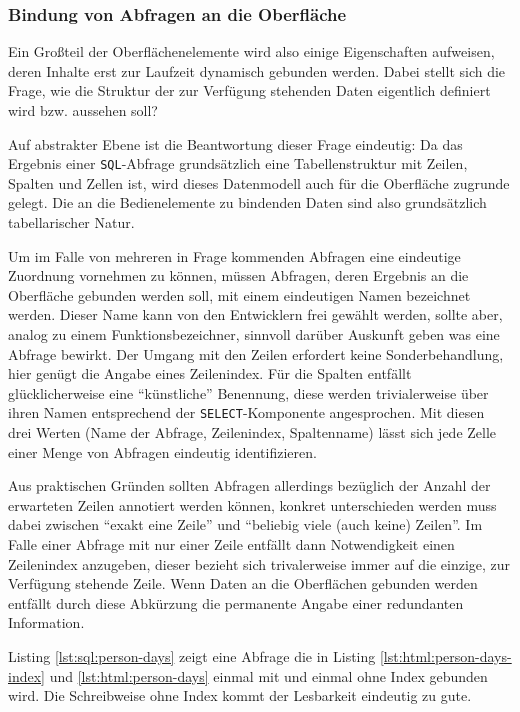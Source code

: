 \subsubsection{Bindung von Abfragen an die Oberfläche}
\label{sec:design-ui-bind-output}

Ein Großteil der Oberflächenelemente wird also einige Eigenschaften aufweisen, deren Inhalte erst zur Laufzeit dynamisch gebunden werden. Dabei stellt sich die Frage, wie die Struktur der zur Verfügung stehenden Daten eigentlich definiert wird bzw. aussehen soll?

Auf abstrakter Ebene ist die Beantwortung dieser Frage eindeutig: Da das Ergebnis einer \texttt{SQL}-Abfrage grundsätzlich eine Tabellenstruktur mit Zeilen, Spalten und Zellen ist, wird dieses Datenmodell auch für die Oberfläche zugrunde gelegt. Die an die Bedienelemente zu bindenden Daten sind also grundsätzlich tabellarischer Natur.

Um im Falle von mehreren in Frage kommenden Abfragen eine eindeutige Zuordnung vornehmen zu können, müssen Abfragen, deren Ergebnis an die Oberfläche gebunden werden soll, mit einem eindeutigen Namen bezeichnet werden. Dieser Name kann von den Entwicklern frei gewählt werden, sollte aber, analog zu einem Funktionsbezeichner, sinnvoll darüber Auskunft geben was eine Abfrage bewirkt. Der Umgang mit den Zeilen erfordert keine Sonderbehandlung, hier genügt die Angabe eines Zeilenindex. Für die Spalten entfällt glücklicherweise eine ``künstliche'' Benennung, diese werden trivialerweise über ihren Namen entsprechend der \texttt{SELECT}-Komponente angesprochen. Mit diesen drei Werten (Name der Abfrage, Zeilenindex, Spaltenname) lässt sich jede Zelle einer Menge von Abfragen eindeutig identifizieren.

Aus praktischen Gründen sollten Abfragen allerdings bezüglich der Anzahl der erwarteten Zeilen annotiert werden können, konkret unterschieden werden muss dabei zwischen ``exakt eine Zeile'' und ``beliebig viele (auch keine) Zeilen''. Im Falle einer Abfrage mit nur einer Zeile entfällt dann Notwendigkeit einen Zeilenindex anzugeben, dieser bezieht sich trivalerweise immer auf die einzige, zur Verfügung stehende Zeile. Wenn Daten an die Oberflächen gebunden werden entfällt durch diese Abkürzung die permanente Angabe einer redundanten Information.

Listing \ref{lst:sql:person-days} zeigt eine Abfrage die in Listing \ref{lst:html:person-days-index} und \ref{lst:html:person-days} einmal mit und einmal ohne Index gebunden wird. Die Schreibweise ohne Index kommt der Lesbarkeit eindeutig zu gute.

